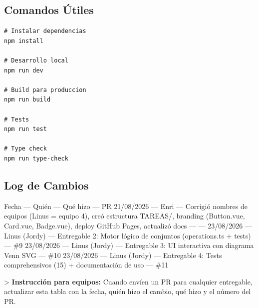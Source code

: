 \documentclass[11pt,a4paper,openany]{book}
\begin{document}
\hrulefill

\subsection{Comandos Útiles}

\begin{lstlisting}[language={},basicstyle=\ttfamily\scriptsize]
# Instalar dependencias
npm install

# Desarrollo local
npm run dev

# Build para produccion
npm run build

# Tests
npm run test

# Type check
npm run type-check
\end{lstlisting}

\hrulefill

\subsection{Log de Cambios}

Fecha --- Quién --- Qué hizo --- PR
21/08/2026 --- Enri --- Corrigió nombres de equipos (Linus = equipo 4), creó estructura TAREAS/, branding (Button.vue, Card.vue, Badge.vue), deploy GitHub Pages, actualizó docs --- ---
23/08/2026 --- Linus (Jordy) --- Entregable 2: Motor lógico de conjuntos (operations.ts + tests) --- \#9
23/08/2026 --- Linus (Jordy) --- Entregable 3: UI interactiva con diagrama Venn SVG --- \#10
23/08/2026 --- Linus (Jordy) --- Entregable 4: Tests comprehensivos (15) + documentación de uso --- \#11

> \textbf{Instrucción para equipos:} Cuando envíen un PR para cualquier entregable, actualizar esta tabla con la fecha, quién hizo el cambio, qué hizo y el número del PR.
\end{document}
